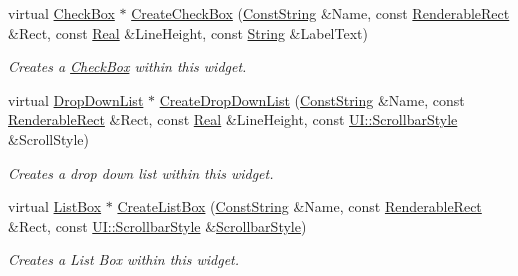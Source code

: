 \begin{DoxyCompactItemize}
virtual \hyperlink{classMezzanine_1_1UI_1_1CheckBox}{CheckBox} $\ast$ \hyperlink{classMezzanine_1_1UI_1_1RenderableContainerWidget_a2d65f8303b6214469f3bd081d2fcd767}{CreateCheckBox} (\hyperlink{namespaceMezzanine_a63cd699ac54b73953f35ec9cfc05e506}{ConstString} \&Name, const \hyperlink{structMezzanine_1_1UI_1_1RenderableRect}{RenderableRect} \&Rect, const \hyperlink{namespaceMezzanine_a726731b1a7df72bf3583e4a97282c6f6}{Real} \&LineHeight, const \hyperlink{namespaceMezzanine_acf9fcc130e6ebf08e3d8491aebcf1c86}{String} \&LabelText)
\begin{DoxyCompactList}\small\item\em Creates a \hyperlink{classMezzanine_1_1UI_1_1CheckBox}{CheckBox} within this widget. \item\end{DoxyCompactList}\item 
virtual \hyperlink{classMezzanine_1_1UI_1_1DropDownList}{DropDownList} $\ast$ \hyperlink{classMezzanine_1_1UI_1_1RenderableContainerWidget_a953791f485efc0a0f6e3a9393c6d610c}{CreateDropDownList} (\hyperlink{namespaceMezzanine_a63cd699ac54b73953f35ec9cfc05e506}{ConstString} \&Name, const \hyperlink{structMezzanine_1_1UI_1_1RenderableRect}{RenderableRect} \&Rect, const \hyperlink{namespaceMezzanine_a726731b1a7df72bf3583e4a97282c6f6}{Real} \&LineHeight, const \hyperlink{namespaceMezzanine_1_1UI_a5998a9bf372a7e92605c0c461736e763}{UI::ScrollbarStyle} \&ScrollStyle)
\begin{DoxyCompactList}\small\item\em Creates a drop down list within this widget. \item\end{DoxyCompactList}\item 
virtual \hyperlink{classMezzanine_1_1UI_1_1ListBox}{ListBox} $\ast$ \hyperlink{classMezzanine_1_1UI_1_1RenderableContainerWidget_a6855ab02db180ce6fcb1ca8309ad4dea}{CreateListBox} (\hyperlink{namespaceMezzanine_a63cd699ac54b73953f35ec9cfc05e506}{ConstString} \&Name, const \hyperlink{structMezzanine_1_1UI_1_1RenderableRect}{RenderableRect} \&Rect, const \hyperlink{namespaceMezzanine_1_1UI_a5998a9bf372a7e92605c0c461736e763}{UI::ScrollbarStyle} \&\hyperlink{namespaceMezzanine_1_1UI_a5998a9bf372a7e92605c0c461736e763}{ScrollbarStyle})
\begin{DoxyCompactList}\small\item\em Creates a List Box within this widget. \item\end{DoxyCompactList}\item 

\end{DoxyCompactItemize}
